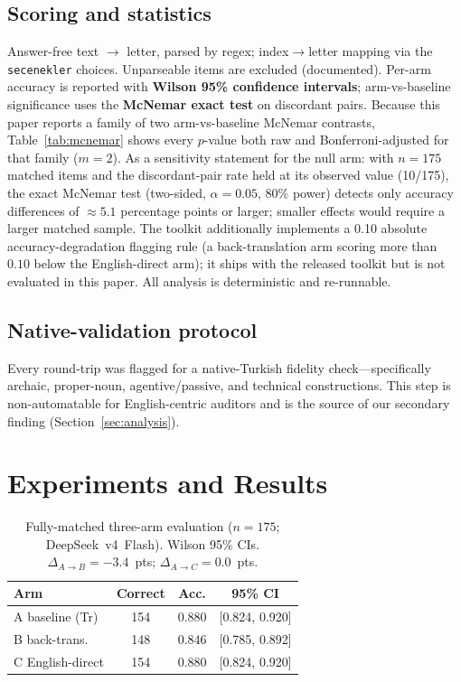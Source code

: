 \documentclass[11pt]{article}
\begin{document}
\subsection{Scoring and statistics}
Answer-free text $\rightarrow$ letter, parsed by regex; index$\rightarrow$letter mapping via the \texttt{secenekler} choices. Unparseable items are excluded (documented). Per-arm accuracy is reported with \textbf{Wilson 95\% confidence intervals}; arm-vs-baseline significance uses the \textbf{McNemar exact test} on discordant pairs. Because this paper reports a family of two arm-vs-baseline McNemar contrasts, Table~\ref{tab:mcnemar} shows every $p$-value both raw and Bonferroni-adjusted for that family ($m{=}2$). As a sensitivity statement for the null arm: with $n{=}175$ matched items and the discordant-pair rate held at its observed value (10/175), the exact McNemar test (two-sided, $\alpha{=}0.05$, 80\% power) detects only accuracy differences of $\approx 5.1$ percentage points or larger; smaller effects would require a larger matched sample. The toolkit additionally implements a 0.10 absolute accuracy-degradation flagging rule (a back-translation arm scoring more than $0.10$ below the English-direct arm); it ships with the released toolkit but is not evaluated in this paper. All analysis is deterministic and re-runnable.

\subsection{Native-validation protocol}
Every round-trip was flagged for a native-Turkish fidelity check---specifically archaic, proper-noun, agentive/passive, and technical constructions. This step is non-automatable for English-centric auditors and is the source of our secondary finding (Section~\ref{sec:analysis}).

\section{Experiments and Results}

\begin{table}[t]
\centering
\small
\begin{tabular}{lccc}
\toprule
\textbf{Arm} & \textbf{Correct} & \textbf{Acc.} & \textbf{95\% CI}\\
\midrule
A baseline (Tr) & 154 & 0.880 & [0.824, 0.920]\\
B back-trans. & 148 & 0.846 & [0.785, 0.892]\\
C English-direct & 154 & 0.880 & [0.824, 0.920]\\
\bottomrule
\end{tabular}
\caption{Fully-matched three-arm evaluation ($n{=}175$; DeepSeek~v4~Flash). Wilson 95\% CIs. $\Delta_{A\rightarrow B}{=}-3.4$~pts; $\Delta_{A\rightarrow C}{=}0.0$~pts.}
\label{tab:arms}
\end{table}
\end{document}
